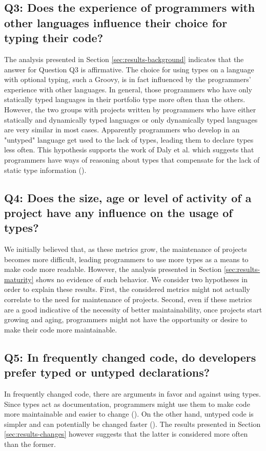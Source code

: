 \documentclass[msc]{ppgccufmg}
\begin{document}
\subsection*{Q3: Does the experience of programmers with other languages influence their choice for typing their code?\label{discussion-q3}}
The analysis presented in Section \ref{sec:results-background} indicates that the answer for Question Q3 is affirmative.
The choice for using types on a language with optional typing, such a Groovy, is in fact influenced by the programmers' experience with other languages.
In general, those programmers who have only statically typed languages in their portfolio type more often than the others.
However, the two groups with projects written by programmers who have either statically and dynamically typed languages or only dynamically typed languages are very similar in most cases.
Apparently programmers who develop in an "untyped" language get used to the lack of types, leading them to declare types less often.
This hypothesis supports the work of Daly et al. which suggests that programmers have ways of reasoning about types that compensate for the lack of static type information (\cite{ruby_vs_druby}).

\subsection*{Q4: Does the size, age or level of activity  of a project have any influence on the usage of types?\label{discussion-q4}}
We initially believed that, as these metrics grow, the maintenance of projects becomes more difficult, leading programmers to use more types as a means to make code more readable.
However, the analysis presented in Section \ref{sec:results-maturity} shows no evidence of such behavior.
We consider two hypotheses in order to explain these results.
First, the considered metrics might not actually correlate to the need for maintenance of projects.
Second, even if these metrics are a good indicative of the necessity of better maintainability, once projects start growing and aging, programmers might not have the opportunity or desire to make their code more maintainable.

\subsection*{Q5: In frequently changed code, do developers prefer typed or untyped declarations?\label{discussion-q5}}
In frequently changed code, there are arguments in favor and against using types.
Since types act as documentation, programmers might use them to make code more maintainable and easier to change  (\cite{should_your_specification_language_be_typed}).
On the other hand, untyped code is simpler and can potentially be changed faster (\cite{gradual_typing}).
The results presented in Section \ref{sec:results-changes} however suggests that the latter is considered more often than the former.
\end{document}
